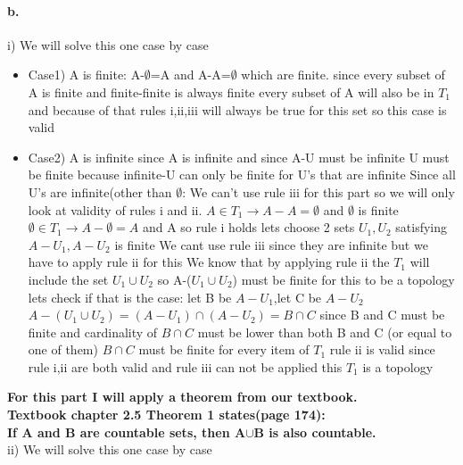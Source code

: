 \documentclass[11pt]{article}
\begin{document}
\paragraph{b.\\}
i) We will solve this one case by case
\begin{itemize}
\item Case1) A is finite:
\subitem A-$\emptyset$=A and A-A=$\emptyset$ which are finite.
\subitem since every subset of A is finite and finite-finite is always finite
\subitem every subset of A will also be in $T_1$
\subitem and because of that rules i,ii,iii will always be true for this set so
\subitem this case is valid
\item Case2) A is infinite
\subitem since A is infinite and since A-U must be infinite U must be finite because infinite-U can only be finite for U's that are infinite
\subitem Since all U's are infinite(other than $\emptyset$: We can't use rule iii for this part so we will only look at validity of rules i and ii.
\subitem $A\in T_1\rightarrow A-A=\emptyset$ and $\emptyset$ is finite 
\subitem $\emptyset\in T_1\rightarrow A-\emptyset=A$ and A
\subitem so rule i holds
\subitem lets choose 2 sets $U_1,U_2$ satisfying $A-U_1,A-U_2$ is finite
\subitem We cant use rule iii since they are infinite but we have to apply rule ii for this
\subitem We know that by applying rule ii the $T_1$ will include the set $U_1\cup U_2$ so A-($U_1\cup U_2$) must be finite for this to be a topology
\subitem lets check if that is the case:
\subitem let B be $A-U_1$,let C be $A-U_2$
\subitem $A-(U_1\cup U_2)=(A-U_1)\cap(A-U_2)=B\cap C$
\subitem since B and C must be finite and cardinality of $B\cap C$ must be lower than both B and C (or equal to one of them)
\subitem $B\cap C$ must be finite
\subitem for every item of $T_1$ rule ii is valid
\subitem since rule i,ii are both valid and rule iii can not be applied this $T_1$ is a topology

\end{itemize}
\textbf{For this part I will apply a theorem from our textbook.}\\
\textbf{Textbook chapter 2.5 Theorem 1 states(page 174):}\\
\textbf{If A and B are countable sets, then A$\cup$B is also countable.}\\
ii) We will solve this one case by case
\end{document}
